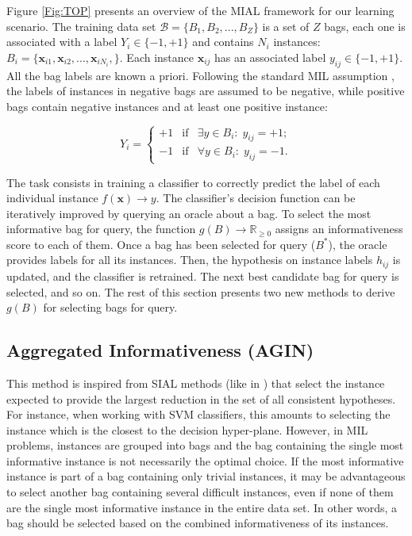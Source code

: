 \documentclass{article}
\begin{document}
Figure \ref{Fig:TOP} presents an overview of the MIAL framework for our learning scenario. The training data set $\mathcal{B} = \{ B_1, B_2, ..., B_Z \}$ is a set of $Z$ bags, each one is associated with a label $Y_i \in \{-1,+1\}$ and contains $N_i$ instances: $B_i = \{\textbf{x}_{i1}, \textbf{x}_{i2}, ..., \textbf{x}_{iN_i}, \}$. Each instance $\textbf{x}_{ij}$ has an associated label $y_{ij}\in \{-1,+1\}$. All the bag labels are known a priori. Following the standard MIL assumption \cite{Dietterich1997}, the labels of instances in negative bags are assumed to be negative, while positive bags contain negative instances and at least one positive instance:

\begin{equation}
Y_i = \left\{\begin{matrix}
+1 & \text{if} & \exists y \in B_i:\; y_{ij}=+1; \\ 
-1 & \text{if} & \forall y \in B_i:\; y_{ij}=-1.
\end{matrix}\right. 
\end{equation}  

The task consists in training a classifier to correctly predict the label of each individual instance $f(\textbf{x}) \rightarrow y$. The classifier's decision function can be iteratively improved by querying an oracle about a bag. To select the most informative bag for query, the function $g(B) \rightarrow \mathbb{R}_{\geq0}$ assigns an informativeness score to each of them. Once a bag has been selected for query ($B^*$), the oracle provides labels for all its instances. Then, the hypothesis on instance labels $h_{ij}$ is updated, and the classifier is retrained. The next best candidate bag for query is selected, and so on. The rest of this section presents two new methods to derive $g(B)$ for selecting bags for query.  


\subsection{Aggregated Informativeness (AGIN)}
\label{Section:AGIN}
This method is inspired from SIAL methods (like in \cite{Tong2001}) that select the instance expected to provide the largest reduction in the set of all consistent hypotheses. For instance, when working with SVM classifiers, this amounts to selecting the instance which is the closest to the decision hyper-plane. However, in MIL problems, instances are grouped into bags and the bag containing the single most informative instance is not necessarily the optimal choice. If the most informative instance is part of a bag containing only trivial instances, it may be advantageous to select another bag containing several difficult instances, even if none of them are the single most informative instance in the entire data set. In other words, a bag should be selected based on the combined informativeness of its instances. 
\end{document}
